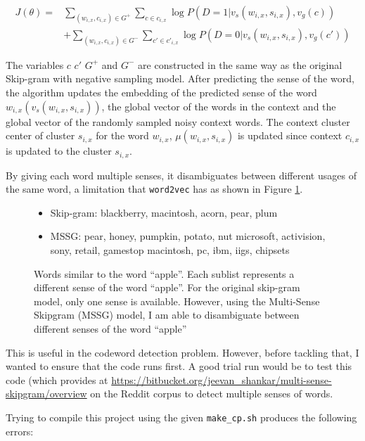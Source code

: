 \begin{align*}
J(\theta) = &\sum_{(w_{i,x}, c_{i,x}) \in G^+} \sum_{c \in c_{i,x}} \log P(D = 1 | v_s(w_{i,x}, s_{i,x}), v_g(c)) \\
&+ \sum_{(w_{i,x}, c_{i,x}) \in G^-} \sum_{c' \in c'_{i,x}} \log P(D = 0 | v_s(w_{i,x}, s_{i,x}), v_g(c'))
\end{align*}

The variables $c$ $c'$ $G^+$ and $G^-$ are constructed in the same way as the original Skip-gram with negative sampling model. After predicting the sense of the word, the algorithm updates the embedding of the predicted sense of the word $w_{i,x}(v_s(w_{i,x}, s_{i,x}))$, the global vector of the words in the context and the global vector of the randomly sampled noisy context words. The context cluster center of cluster $s_{i,x}$ for the word $w_{i,x}$, $\mu(w_{i,x}, s_{i,x})$ is updated since context $c_{i,x}$ is updated to the cluster $s_{i,x}$.

By giving each word multiple senses, it disambiguates between different usages of the same word, a limitation that \texttt{word2vec} has as shown in Figure \ref{fig-mssg-demo}.

\begin{figure}[H]
\begin{itemize}
\item Skip-gram: 
\subitem blackberry, macintosh, acorn, pear, plum
\item MSSG:
\subitem pear, honey, pumpkin, potato, nut 
\subitem microsoft, activision, sony, retail, gamestop
\subitem macintosh, pc, ibm, iigs, chipsets
\end{itemize}
\caption{Words similar to the word ``apple''. Each sublist represents a different sense of the word ``apple''. For the original skip-gram model, only one sense is available. However, using the Multi-Sense Skipgram (MSSG) model, I am able to disambiguate between different senses of the word ``apple''}
\label{fig-mssg-demo}
\end{figure}

This is useful in the codeword detection problem. However, before tackling that, I wanted to ensure that the code runs first. A good trial run would be to test this code (which \cite{neelakantan2015efficient} provides at \url{https://bitbucket.org/jeevan_shankar/multi-sense-skipgram/overview} on the Reddit corpus to detect multiple senses of words.

Trying to compile this project using the given \texttt{make\_cp.sh} produces the following errors:

